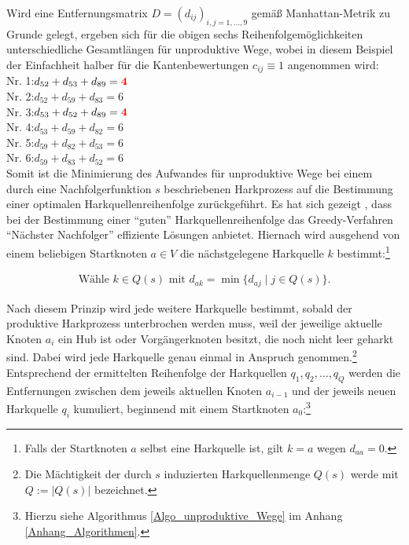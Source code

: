 \documentclass[fontsize=12pt,doubleside,openany,listof=totoc,listof=flat,listof=nochaptergap,numbers=noenddot]{scrbook}
\theoremstyle{style}
\begin{document}
\noindent Wird eine Entfernungsmatrix $D = (d_{ij})_{i,j=1,\dots,9}$ gemäß Manhattan-Metrik zu Grunde gelegt, ergeben sich für die obigen sechs Reihenfolgemöglichkeiten unterschiedliche Gesamtlängen für unproduktive Wege, wobei in diesem Beispiel der Einfachheit halber für die Kantenbewertungen $c_{ij}\equiv 1$ angenommen wird:\\

\noindent 
\phantom \qquad Nr. 1:\quad $d_{52} + d_{53} + d_{89} = \textbf{\textcolor{red}{4}}$ \\
\phantom \qquad Nr. 2:\quad $d_{52} + d_{59} + d_{83} = 6$ \\
\phantom \qquad Nr. 3:\quad $d_{53} + d_{52} + d_{89} = \textbf{\textcolor{red}{4}}$ \\
\phantom \qquad Nr. 4:\quad $d_{53} + d_{59} + d_{82} = 6$ \\
\phantom \qquad Nr. 5:\quad $d_{59} + d_{82} + d_{53} = 6$ \\
\phantom \qquad Nr. 6:\quad $d_{59} + d_{83} + d_{52} = 6$ \\

\noindent Somit ist die Minimierung des Aufwandes für unproduktive Wege bei einem durch eine Nachfolgerfunktion $s$ beschriebenen Harkprozess auf die Bestimmung einer optimalen Harkquellenreihenfolge zurückgeführt. Es hat sich gezeigt \cite{felker}, dass bei der Bestimmung einer "`guten"' Harkquellenreihenfolge das Greedy-Verfahren "`Nächster Nachfolger"' effiziente Lösungen anbietet. Hiernach wird ausgehend von einem beliebigen Startknoten $a \in V$ die nächstgelegene Harkquelle $k$ bestimmt:\footnote{Falls der Startknoten $a$ selbst eine Harkquelle ist, gilt $k = a$ wegen $d_{aa} = 0$.}

\begin{align}
\text{Wähle } k \in Q(s) \text{ mit } d_{ak} = \min\{d_{aj} \mid j \in Q(s)\}.
\end{align}	

\noindent Nach diesem Prinzip wird jede weitere Harkquelle bestimmt, sobald der produktive Harkprozess unterbrochen werden muss, weil der jeweilige aktuelle Knoten $a_i$ ein Hub ist oder Vorgängerknoten besitzt, die noch nicht leer geharkt sind. Dabei wird jede Harkquelle genau einmal in Anspruch genommen.\footnote{Die Mächtigkeit der durch $s$ induzierten Harkquellenmenge $Q(s)$ werde mit $Q := |Q(s)|$ bezeichnet.} Entsprechend der ermittelten Reihenfolge der Harkquellen $q_1, q_2, \dots, q_Q$ werden die Entfernungen zwischen dem jeweils aktuellen Knoten $a_{i-1}$ und der jeweils neuen Harkquelle $q_i$ kumuliert, beginnend mit einem Startknoten $a_0$:\footnote{Hierzu siehe Algorithmus \ref{Algo_unproduktive_Wege} im Anhang \ref{Anhang_Algorithmen}.} 
 
\end{document}
